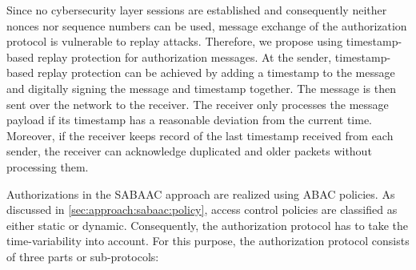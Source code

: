 Since no cybersecurity layer sessions are established and consequently neither nonces nor sequence numbers can be used, message exchange of the authorization protocol is vulnerable to replay attacks.
Therefore, we propose using timestamp-based replay protection for authorization messages.
At the sender, timestamp-based replay protection can be achieved by adding a timestamp to the message and digitally signing the message and timestamp together.
The message is then sent over the network to the receiver.
The receiver only processes the message payload if its timestamp has a reasonable deviation from the current time.
Moreover, if the receiver keeps record of the last timestamp received from each sender, the receiver can acknowledge duplicated and older packets without processing them.

Authorizations in the SABAAC approach are realized using ABAC policies.
As discussed in \autoref{sec:approach:sabaac:policy}, access control policies are classified as either static or dynamic.
Consequently, the authorization protocol has to take the time-variability into account.
For this purpose, the authorization protocol consists of three parts or sub-protocols:
